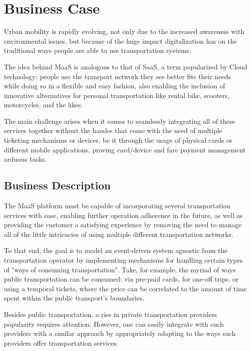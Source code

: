 \documentclass[runningheads,a4]{llncs}
\begin{document}
\maketitle

\section{Business Case}
\label{sec:business}
Urban mobility is rapidly evolving, not only due to the increased awareness with
environmental issues, but because of the huge impact digitalization has on the
traditional ways people are able to use transportation systems.

The idea behind \ac{MaaS} is analogous to that of \ac{SaaS}, a term popularized
by Cloud technology: people use the transport network they see better fits their
needs while doing so in a flexible and easy fashion, also enabling the inclusion
of innovative alternatives for personal transportation like rental bike,
scooters, motorcycles, and the likes.

The main challenge arises when it comes to seamlessly integrating all of these
services together without the hassles that come with the need of multiple
ticketing mechanisms or devices, be it through the usage of physical cards or
different mobile applications, proving card/device and fare payment management
arduous tasks.

\subsection{Business Description}
\label{sec:business.description}
The \ac{MaaS} platform must be capable of incorporating several transportation
services with ease, enabling further operation adherence in the future, as well
as providing the customer a satisfying experience by removing the need to manage
all of the little intricacies of using multiple different transportation
networks.

To that end, the goal is to model an event-driven system agnostic from the
transportation operator by implementing mechanisms for handling certain types of
"ways of consuming transportation". Take, for example, the myriad of ways public
transportation can be consumed: via pre-paid cards, for one-off trips, or using
a temporal tickets, where the price can be correlated to the amount of time
spent within the public transport's boundaries.

Besides public transportation, a rise in private transportation providers
popularity requires attention. However, one can easily integrate with such
providers with a similar approach by appropriately adapting to the ways such
providers offer transportation services.
\end{document}
